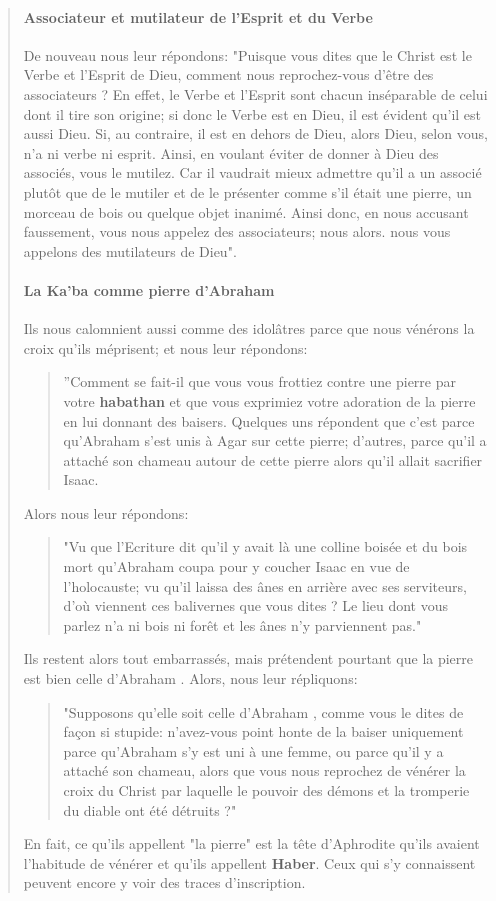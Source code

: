 \begin{quote}
\paragraph{Associateur et mutilateur de l'Esprit et du Verbe}
De nouveau nous leur répondons: "Puisque vous dites que le Christ est le Verbe et l'Esprit de Dieu, comment nous reprochez-vous d'être des associateurs ? En effet, le Verbe et l'Esprit sont chacun inséparable de celui dont il tire son origine; si donc le Verbe est en Dieu, il est évident qu'il est aussi Dieu. Si, au contraire, il est en dehors de Dieu, alors Dieu, selon vous, n'a ni verbe ni esprit. Ainsi, en voulant éviter de donner à Dieu des associés, vous le mutilez. Car il vaudrait mieux admettre qu'il a un associé plutôt que de le mutiler et de le présenter comme s'il était une pierre, un morceau de bois ou quelque objet inanimé. Ainsi donc, en nous accusant faussement, vous nous appelez des associateurs; nous alors. nous vous appelons des mutilateurs de Dieu".
\paragraph{La Ka'ba comme pierre d'Abraham}
Ils nous calomnient aussi comme des idolâtres parce que nous vénérons la croix qu'ils méprisent; et nous leur répondons: \begin{quote}
    ''Comment se fait-il que vous vous frottiez contre une pierre par votre \textbf{habathan} et que vous exprimiez votre adoration de la pierre en lui donnant des baisers. Quelques uns répondent que c'est parce qu'Abraham s'est unis à Agar sur cette pierre; d'autres, parce qu'il a attaché son chameau autour de cette pierre alors qu'il allait sacrifier Isaac.
\end{quote} Alors nous leur répondons: 
\begin{quote}
    "Vu que l'Ecriture dit qu'il y avait là une colline boisée et du bois mort qu'Abraham coupa pour y coucher Isaac en vue de l'holocauste; vu qu'il laissa des ânes en arrière avec ses serviteurs, d'où viennent ces balivernes que vous dites ? Le lieu dont vous parlez n'a ni bois ni forêt et les ânes n'y parviennent pas." 
\end{quote}

Ils restent alors tout embarrassés, mais prétendent pourtant que la pierre est bien celle d'Abraham . Alors, nous leur répliquons: \begin{quote}
    "Supposons qu'elle soit celle d'Abraham , comme vous le dites de façon si stupide: n'avez-vous point honte de la baiser uniquement parce qu'Abraham s'y est uni à une femme, ou parce qu'il y a attaché son chameau, alors que vous nous reprochez de vénérer la croix du Christ par laquelle le pouvoir des démons et la tromperie du diable ont été détruits ?"
\end{quote} 

En fait, ce qu'ils appellent "la pierre" est la tête d'Aphrodite qu'ils avaient l'habitude de
vénérer et qu'ils appellent \textbf{Haber}. Ceux qui s'y connaissent peuvent encore y voir des traces d'inscription.
\end{quote}

